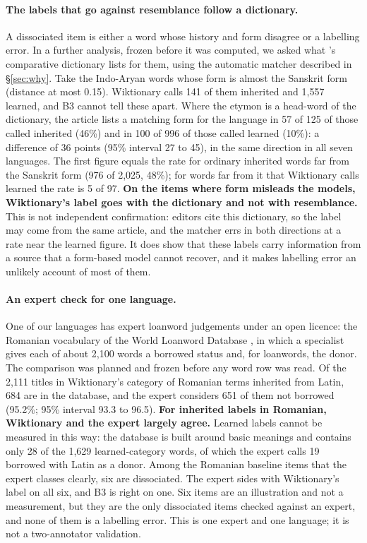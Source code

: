 \documentclass[11pt]{article}
\begin{document}
\paragraph{The labels that go against resemblance follow a dictionary.} A dissociated item is either a word whose history and form disagree or a labelling error. In a further analysis, frozen before it was computed, we asked what \citeauthor{turner1966cdial}'s comparative dictionary lists for them, using the automatic matcher described in \S\ref{sec:why}. Take the Indo-Aryan words whose form is almost the Sanskrit form (distance at most 0.15). Wiktionary calls 141 of them inherited and 1,557 learned, and B3 cannot tell these apart. Where the etymon is a head-word of the dictionary, the article lists a matching form for the language in 57 of 125 of those called inherited (46\%) and in 100 of 996 of those called learned (10\%): a difference of 36 points (95\% interval 27 to 45), in the same direction in all seven languages. The first figure equals the rate for ordinary inherited words far from the Sanskrit form (976 of 2,025, 48\%); for words far from it that Wiktionary calls learned the rate is 5 of 97. \textbf{On the items where form misleads the models, Wiktionary's label goes with the dictionary and not with resemblance.} This is not independent confirmation: editors cite this dictionary, so the label may come from the same article, and the matcher errs in both directions at a rate near the learned figure. It does show that these labels carry information from a source that a form-based model cannot recover, and it makes labelling error an unlikely account of most of them.

\paragraph{An expert check for one language.} One of our languages has expert loanword judgements under an open licence: the Romanian vocabulary of the World Loanword Database \citep{schulte2009romanian}, in which a specialist gives each of about 2,100 words a borrowed status and, for loanwords, the donor. The comparison was planned and frozen before any word row was read. Of the 2,111 titles in Wiktionary's category of Romanian terms inherited from Latin, 684 are in the database, and the expert considers 651 of them not borrowed (95.2\%; 95\% interval 93.3 to 96.5). \textbf{For inherited labels in Romanian, Wiktionary and the expert largely agree.} Learned labels cannot be measured in this way: the database is built around basic meanings and contains only 28 of the 1,629 learned-category words, of which the expert calls 19 borrowed with Latin as a donor. Among the Romanian baseline items that the expert classes clearly, six are dissociated. The expert sides with Wiktionary's label on all six, and B3 is right on one. Six items are an illustration and not a measurement, but they are the only dissociated items checked against an expert, and none of them is a labelling error. This is one expert and one language; it is not a two-annotator validation.
\end{document}
